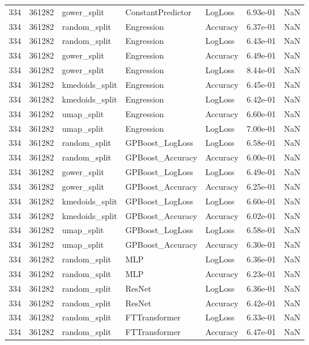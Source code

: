 \begin{tabular}{rrlllrr}
334 & 361282 & gower\_split & ConstantPredictor & LogLoss & 6.93e-01 & NaN \\
334 & 361282 & random\_split & Engression & Accuracy & 6.37e-01 & NaN \\
334 & 361282 & random\_split & Engression & LogLoss & 6.43e-01 & NaN \\
334 & 361282 & gower\_split & Engression & Accuracy & 6.49e-01 & NaN \\
334 & 361282 & gower\_split & Engression & LogLoss & 8.44e-01 & NaN \\
334 & 361282 & kmedoids\_split & Engression & Accuracy & 6.45e-01 & NaN \\
334 & 361282 & kmedoids\_split & Engression & LogLoss & 6.42e-01 & NaN \\
334 & 361282 & umap\_split & Engression & Accuracy & 6.60e-01 & NaN \\
334 & 361282 & umap\_split & Engression & LogLoss & 7.00e-01 & NaN \\
334 & 361282 & random\_split & GPBoost\_LogLoss & LogLoss & 6.58e-01 & NaN \\
334 & 361282 & random\_split & GPBoost\_Accuracy & Accuracy & 6.00e-01 & NaN \\
334 & 361282 & gower\_split & GPBoost\_LogLoss & LogLoss & 6.49e-01 & NaN \\
334 & 361282 & gower\_split & GPBoost\_Accuracy & Accuracy & 6.25e-01 & NaN \\
334 & 361282 & kmedoids\_split & GPBoost\_LogLoss & LogLoss & 6.60e-01 & NaN \\
334 & 361282 & kmedoids\_split & GPBoost\_Accuracy & Accuracy & 6.02e-01 & NaN \\
334 & 361282 & umap\_split & GPBoost\_LogLoss & LogLoss & 6.58e-01 & NaN \\
334 & 361282 & umap\_split & GPBoost\_Accuracy & Accuracy & 6.30e-01 & NaN \\
334 & 361282 & random\_split & MLP & LogLoss & 6.36e-01 & NaN \\
334 & 361282 & random\_split & MLP & Accuracy & 6.23e-01 & NaN \\
334 & 361282 & random\_split & ResNet & LogLoss & 6.36e-01 & NaN \\
334 & 361282 & random\_split & ResNet & Accuracy & 6.42e-01 & NaN \\
334 & 361282 & random\_split & FTTransformer & LogLoss & 6.33e-01 & NaN \\
334 & 361282 & random\_split & FTTransformer & Accuracy & 6.47e-01 & NaN \\

\end{tabular}
